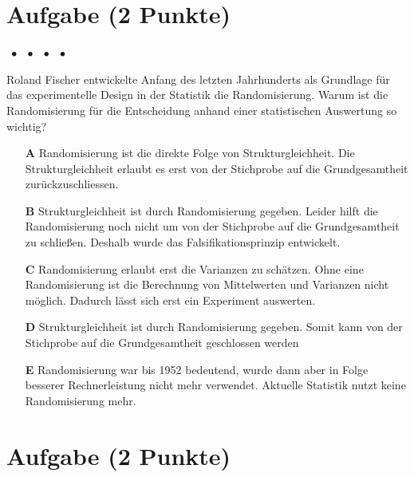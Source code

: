\documentclass[a4paper, 9pt]{scrartcl}\usepackage[]{graphicx}\usepackage[]{xcolor}
\begin{document}
\section{Aufgabe \hfill (2 Punkte)}

\ifcollection
\begin{flushright}
\tiny\vspace{-2Ex}
\textbf{\examinhaltstart}
\exammodulemathstat $\;\bullet$
\exammodulestat $\;\bullet$
\exammodulestatbbv $\;\bullet$
\exammodulestatversuch $\;\bullet$
\exammodulebiostat
\vspace{-1Ex}
\end{flushright}
\fi



Roland Fischer entwickelte Anfang des letzten Jahrhunderts als Grundlage für das experimentelle Design in der Statistik die Randomisierung. Warum ist die Randomisierung für die Entscheidung anhand einer statistischen Auswertung so wichtig?



\begin{enumerate}
\item [\textbf{A} \msquare] Randomisierung ist die direkte Folge von Strukturgleichheit. Die Strukturgleichheit erlaubt es erst von der Stichprobe auf die Grundgesamtheit zurückzuschliessen.
\item [\textbf{B} \msquare] Strukturgleichheit ist durch Randomisierung gegeben. Leider hilft die Randomisierung noch nicht um von der Stichprobe auf die Grundgesamtheit zu schließen. Deshalb wurde das Falsifikationsprinzip entwickelt.
\item [\textbf{C} \msquare] Randomisierung erlaubt erst die Varianzen zu schätzen. Ohne eine Randomisierung ist die Berechnung von Mittelwerten und Varianzen nicht möglich. Dadurch lässt sich erst ein Experiment auswerten.
\item [\textbf{D} \msquare] Strukturgleichheit ist durch Randomisierung gegeben. Somit kann von der Stichprobe auf die Grundgesamtheit geschlossen werden
\item [\textbf{E} \msquare] Randomisierung war bis 1952 bedeutend, wurde dann aber in Folge besserer Rechnerleistung nicht mehr verwendet. Aktuelle Statistik nutzt keine Randomisierung mehr.
\end{enumerate}

\section{Aufgabe \hfill (2 Punkte)}
\end{document}
